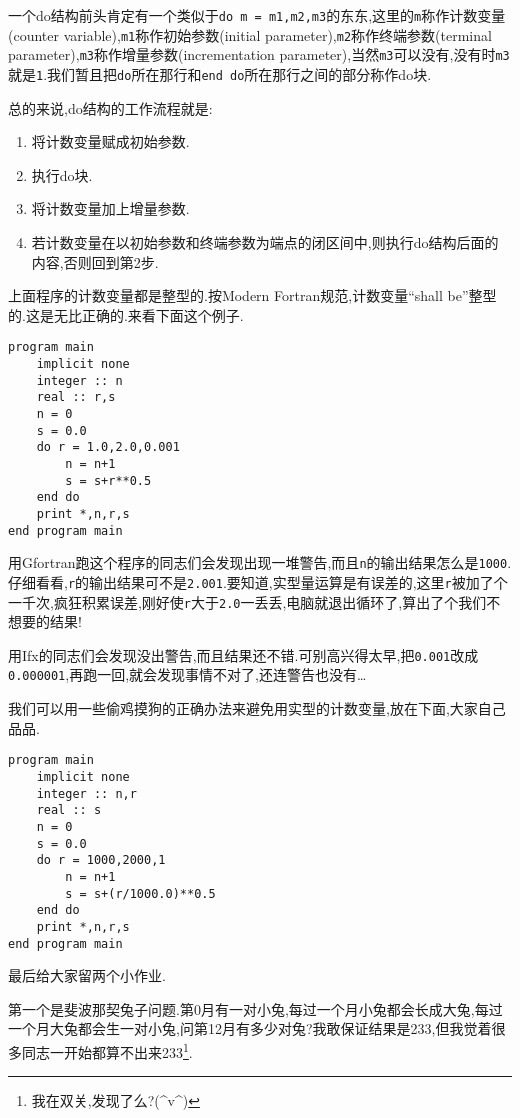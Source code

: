 一个do结构前头肯定有一个类似于\texttt{do m = m1,m2,m3}的东东,这里的\texttt{m}称作计数变量(counter variable),\texttt{m1}称作初始参数(initial parameter),\texttt{m2}称作终端参数(terminal parameter),\texttt{m3}称作增量参数(incrementation parameter),当然\texttt{m3}可以没有,没有时\texttt{m3}就是\texttt{1}.我们暂且把\texttt{do}所在那行和\texttt{end do}所在那行之间的部分称作do块.

总的来说,do结构的工作流程就是:
\begin{enumerate}
    \item 将计数变量赋成初始参数.
    \item 执行do块.
    \item 将计数变量加上增量参数.
    \item 若计数变量在以初始参数和终端参数为端点的闭区间中,则执行do结构后面的内容,否则回到第2步.
\end{enumerate}

上面程序的计数变量都是整型的.按Modern Fortran规范,计数变量``shall be''整型的.这是无比正确的.来看下面这个例子.
\begin{lstlisting}
program main
    implicit none
    integer :: n
    real :: r,s
    n = 0
    s = 0.0
    do r = 1.0,2.0,0.001
        n = n+1
        s = s+r**0.5
    end do
    print *,n,r,s
end program main
\end{lstlisting}

用Gfortran跑这个程序的同志们会发现出现一堆警告,而且\texttt{n}的输出结果怎么是\texttt{1000}.仔细看看,\texttt{r}的输出结果可不是\texttt{2.001}.要知道,实型量运算是有误差的,这里\texttt{r}被加了个一千次,疯狂积累误差,刚好使\texttt{r}大于\texttt{2.0}一丢丢,电脑就退出循环了,算出了个我们不想要的结果!

用Ifx的同志们会发现没出警告,而且结果还不错.可别高兴得太早,把\texttt{0.001}改成\texttt{0.000001},再跑一回,就会发现事情不对了,还连警告也没有\dots

我们可以用一些偷鸡摸狗的正确办法来避免用实型的计数变量,放在下面,大家自己品品.
\begin{lstlisting}
program main
    implicit none
    integer :: n,r
    real :: s
    n = 0
    s = 0.0
    do r = 1000,2000,1
        n = n+1
        s = s+(r/1000.0)**0.5
    end do
    print *,n,r,s
end program main
\end{lstlisting}

最后给大家留两个小作业.

第一个是斐波那契兔子问题.第0月有一对小兔,每过一个月小兔都会长成大兔,每过一个月大兔都会生一对小兔,问第12月有多少对兔?我敢保证结果是233,但我觉着很多同志一开始都算不出来233\footnote{
    我在双关,发现了么?(\^{}v\^{})
}.

